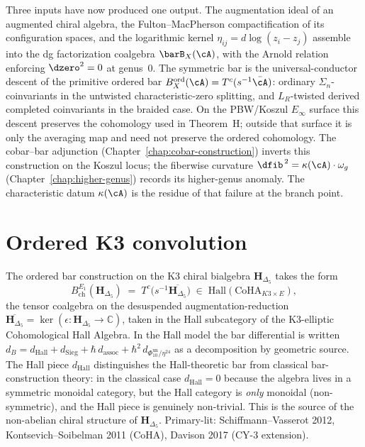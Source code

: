 \medskip\noindent
Three inputs have now produced one output. The augmentation ideal of an
augmented chiral algebra, the Fulton--MacPherson compactification of its
configuration spaces, and the logarithmic kernel
$\eta_{ij}=d\log(z_i-z_j)$ assemble into the dg factorization coalgebra
$\barB_X(\cA)$, with the Arnold relation enforcing $\dzero^2=0$ at
genus~$0$. The symmetric bar is the universal-conductor descent of the
primitive ordered bar
$B^{\mathrm{ord}}_X(\cA)=T^c(s^{-1}\bar\cA)$: ordinary
$\Sigma_n$-coinvariants in the untwisted characteristic-zero splitting,
and $L_R$-twisted derived completed coinvariants in the braided case.
On the PBW/Koszul $E_\infty$ surface this descent preserves the
cohomology used in Theorem~H; outside that surface it is only the
averaging map and need not preserve the ordered cohomology. The
cobar--bar adjunction
(Chapter~\ref{chap:cobar-construction}) inverts this construction on
the Koszul locus; the fiberwise curvature
$\dfib^{\,2}=\kappa(\cA)\cdot\omega_g$
(Chapter~\ref{chap:higher-genus}) records its higher-genus anomaly. The
characteristic datum $\kappa(\cA)$ is the residue of that failure at the
branch point.

\section{Ordered K3 convolution}
\label{sec:barconstr-supplement}

\begin{definition}
\label{rem:barconstr-1}
The ordered bar construction on the K3 chiral bialgebra
$\mathbf H_{\Delta_5}$ takes the form
\[
B^{E_1}_{\mathrm{ch}}(\mathbf H_{\Delta_5}) \;=\; T^c\bigl(s^{-1}\overline{\mathbf H_{\Delta_5}}\bigr) \;\in\; \mathrm{Hall}(\mathrm{CoHA}_{K3\times E}),
\]
the tensor coalgebra on the desuspended augmentation-reduction
$\overline{\mathbf H_{\Delta_5}} = \ker(\epsilon:\mathbf H_{\Delta_5}\to\mathbb C)$,
taken in the Hall subcategory of the K3-elliptic Cohomological Hall
Algebra. In the Hall model the bar differential is written
$d_B = d_{\mathrm{Hall}} + d_{\mathrm{Sieg}} + \hbar\, d_{\mathrm{assoc}} + \hbar^2\, d_{\Phi_{10}^{\mathrm{un}}/\eta^{24}}$
as a decomposition by geometric source. The Hall piece
$d_{\mathrm{Hall}}$ distinguishes the Hall-theoretic bar from classical
bar-construction theory: in the classical case $d_{\mathrm{Hall}} = 0$
because the algebra lives in a symmetric monoidal category, but the Hall
category is \emph{only} monoidal (non-symmetric), and the Hall piece
is genuinely non-trivial. This is the source of the non-abelian chiral
structure of $\mathbf H_{\Delta_5}$. Primary-lit: Schiffmann--Vasserot
2012, Kontsevich--Soibelman 2011 ($\mathrm{CoHA}$), Davison 2017 (CY-3
extension).
\end{definition}

